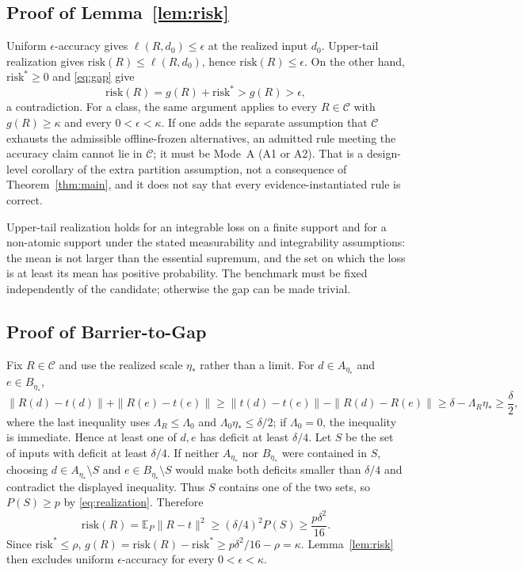 \documentclass[twoside,11pt]{article}
\begin{document}
\subsection{Proof of Lemma~\ref{lem:risk}}
Uniform $\epsilon$-accuracy gives $\ell(R,d_0)\le\epsilon$ at the realized input $d_0$. Upper-tail realization gives $\mathrm{risk}(R)\le\ell(R,d_0)$, hence $\mathrm{risk}(R)\le\epsilon$. On the other hand, $\mathrm{risk}^*\ge0$ and \eqref{eq:gap} give
\[
\mathrm{risk}(R)=g(R)+\mathrm{risk}^*>g(R)>\epsilon,
\]
a contradiction. For a class, the same argument applies to every $R\in\mathcal{C}$ with $g(R)\ge\kappa$ and every $0<\epsilon<\kappa$. If one adds the separate assumption that $\mathcal{C}$ exhausts the admissible offline-frozen alternatives, an admitted rule meeting the accuracy claim cannot lie in $\mathcal{C}$; it must be Mode~A (A1 or A2). That is a design-level corollary of the extra partition assumption, not a consequence of Theorem~\ref{thm:main}, and it does not say that every evidence-instantiated rule is correct.

Upper-tail realization holds for an integrable loss on a finite support and for a non-atomic support under the stated measurability and integrability assumptions: the mean is not larger than the essential supremum, and the set on which the loss is at least its mean has positive probability. The benchmark must be fixed independently of the candidate; otherwise the gap can be made trivial.

\subsection{Proof of Barrier-to-Gap}
Fix $R\in\mathcal{C}$ and use the realized scale $\eta_*$ rather than a limit. For $d\in A_{\eta_*}$ and $e\in B_{\eta_*}$,
\[
\|R(d)-t(d)\|+\|R(e)-t(e)\|
\ge\|t(d)-t(e)\|-\|R(d)-R(e)\|
\ge\delta-\Lambda_R\eta_*
\ge\frac{\delta}{2},
\]
where the last inequality uses $\Lambda_R\le\Lambda_0$ and $\Lambda_0\eta_*\le\delta/2$; if $\Lambda_0=0$, the inequality is immediate. Hence at least one of $d,e$ has deficit at least $\delta/4$. Let $S$ be the set of inputs with deficit at least $\delta/4$. If neither $A_{\eta_*}$ nor $B_{\eta_*}$ were contained in $S$, choosing $d\in A_{\eta_*}\setminus S$ and $e\in B_{\eta_*}\setminus S$ would make both deficits smaller than $\delta/4$ and contradict the displayed inequality. Thus $S$ contains one of the two sets, so $P(S)\ge p$ by \eqref{eq:realization}. Therefore
\[
\mathrm{risk}(R)=\mathbb{E}_P\|R-t\|^2
\ge(\delta/4)^2P(S)
\ge\frac{p\delta^2}{16}.
\]
Since $\mathrm{risk}^*\le\rho$, $g(R)=\mathrm{risk}(R)-\mathrm{risk}^*\ge p\delta^2/16-\rho=\kappa$. Lemma~\ref{lem:risk} then excludes uniform $\epsilon$-accuracy for every $0<\epsilon<\kappa$.
\end{document}
